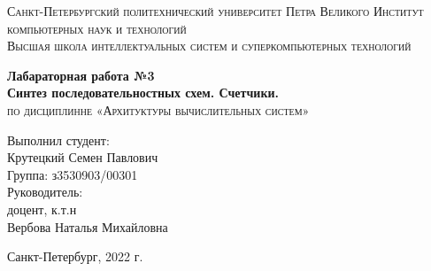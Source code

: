 \begin{titlepage}
    \begin{center}
        \textsc{
            Санкт-Петербургский политехнический университет Петра Великого Институт компьютерных наук и технологий \\[5mm]
            Высшая школа интеллектуальных систем и суперкомпьютерных технологий    
        }

        \vfill

        \textbf{
            Лабараторная работа №3 \\[2mm]
            Синтез последовательностных схем. Счетчики. \\
        }
        \textsc{
            по дисциплинне «Архитуктуры вычислительных систем»
        }
    \end{center}

    \hfill

    \begin{flushright}
        \begin{minipage}{0.35\textwidth}
            Выполнил студент: \\[2mm]
            Крутецкий Семен Павлович \\
            Группа: з3530903/00301 \\[15mm]
            Руководитель:\\[2mm] 
            доцент, к.т.н \\
            Вербова Наталья Михайловна
        \end{minipage}
    \end{flushright}
    
    \vfill

    \begin{center}
        Санкт-Петербург, 2022 г.
    \end{center}
\end{titlepage}

\newpage

\tableofcontents
\newpage